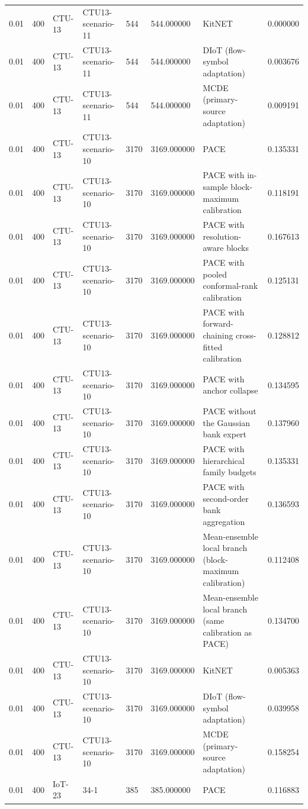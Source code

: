 \begin{tabular}{llllllll}
0.01 & 400 & CTU-13 & CTU13-scenario-11 & 544 & 544.000000 & KitNET & 0.000000 \\
0.01 & 400 & CTU-13 & CTU13-scenario-11 & 544 & 544.000000 & DIoT (flow-symbol adaptation) & 0.003676 \\
0.01 & 400 & CTU-13 & CTU13-scenario-11 & 544 & 544.000000 & MCDE (primary-source adaptation) & 0.009191 \\
0.01 & 400 & CTU-13 & CTU13-scenario-10 & 3170 & 3169.000000 & PACE & 0.135331 \\
0.01 & 400 & CTU-13 & CTU13-scenario-10 & 3170 & 3169.000000 & PACE with in-sample block-maximum calibration & 0.118191 \\
0.01 & 400 & CTU-13 & CTU13-scenario-10 & 3170 & 3169.000000 & PACE with resolution-aware blocks & 0.167613 \\
0.01 & 400 & CTU-13 & CTU13-scenario-10 & 3170 & 3169.000000 & PACE with pooled conformal-rank calibration & 0.125131 \\
0.01 & 400 & CTU-13 & CTU13-scenario-10 & 3170 & 3169.000000 & PACE with forward-chaining cross-fitted calibration & 0.128812 \\
0.01 & 400 & CTU-13 & CTU13-scenario-10 & 3170 & 3169.000000 & PACE with anchor collapse & 0.134595 \\
0.01 & 400 & CTU-13 & CTU13-scenario-10 & 3170 & 3169.000000 & PACE without the Gaussian bank expert & 0.137960 \\
0.01 & 400 & CTU-13 & CTU13-scenario-10 & 3170 & 3169.000000 & PACE with hierarchical family budgets & 0.135331 \\
0.01 & 400 & CTU-13 & CTU13-scenario-10 & 3170 & 3169.000000 & PACE with second-order bank aggregation & 0.136593 \\
0.01 & 400 & CTU-13 & CTU13-scenario-10 & 3170 & 3169.000000 & Mean-ensemble local branch (block-maximum calibration) & 0.112408 \\
0.01 & 400 & CTU-13 & CTU13-scenario-10 & 3170 & 3169.000000 & Mean-ensemble local branch (same calibration as PACE) & 0.134700 \\
0.01 & 400 & CTU-13 & CTU13-scenario-10 & 3170 & 3169.000000 & KitNET & 0.005363 \\
0.01 & 400 & CTU-13 & CTU13-scenario-10 & 3170 & 3169.000000 & DIoT (flow-symbol adaptation) & 0.039958 \\
0.01 & 400 & CTU-13 & CTU13-scenario-10 & 3170 & 3169.000000 & MCDE (primary-source adaptation) & 0.158254 \\
0.01 & 400 & IoT-23 & 34-1 & 385 & 385.000000 & PACE & 0.116883 \\

\end{tabular}
